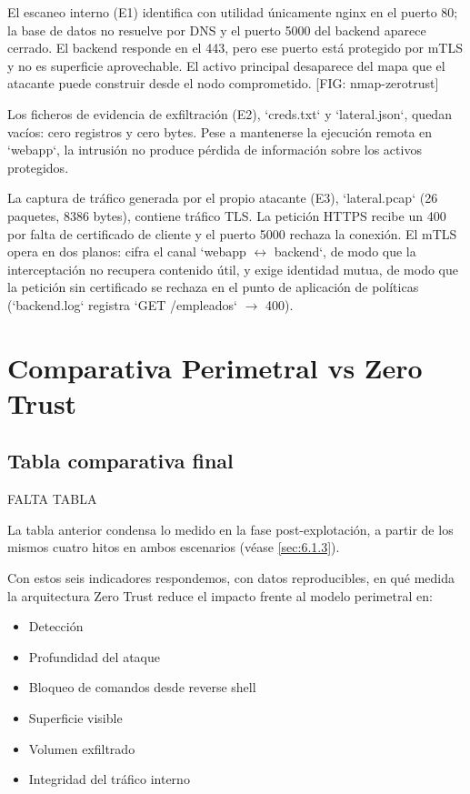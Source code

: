 \documentclass[11pt,spanish,listoffigures,listoftables]{tfgetsinf}
\begin{document}
        El escaneo interno (E1) identifica con utilidad únicamente nginx en el puerto 80; la base de datos no resuelve por DNS y el puerto 5000 del backend aparece cerrado. El backend responde en el 443, pero ese puerto está protegido por mTLS y no es superficie aprovechable. El activo principal desaparece del mapa que el atacante puede construir desde el nodo comprometido. [FIG: nmap-zerotrust]
        
        Los ficheros de evidencia de exfiltración (E2), `creds.txt` y `lateral.json`, quedan vacíos: cero registros y cero bytes. Pese a mantenerse la ejecución remota en `webapp`, la intrusión no produce pérdida de información sobre los activos protegidos.
        
        La captura de tráfico generada por el propio atacante (E3), `lateral.pcap` (26 paquetes, 8386 bytes), contiene tráfico TLS. La petición HTTPS recibe un 400 por falta de certificado de cliente y el puerto 5000 rechaza la conexión. El mTLS opera en dos planos: cifra el canal `webapp $\leftrightarrow$ backend`, de modo que la interceptación no recupera contenido útil, y exige identidad mutua, de modo que la petición sin certificado se rechaza en el punto de aplicación de políticas (`backend.log` registra `GET /empleados` $\rightarrow$ 400).

    \section{Comparativa Perimetral vs Zero Trust}
    \label{sec:6.4}
        \subsection{Tabla comparativa final}
        FALTA TABLA

        La tabla anterior condensa lo medido en la fase post-explotación, a partir de los mismos cuatro hitos en ambos escenarios (véase \cref{sec:6.1.3}). 

        Con estos seis indicadores respondemos, con datos reproducibles, en qué medida la arquitectura Zero Trust reduce el impacto frente al modelo perimetral en:
        \begin{itemize}
            \item Detección
            \item Profundidad del ataque
            \item Bloqueo de comandos desde reverse shell
            \item Superficie visible
            \item Volumen exfiltrado
            \item Integridad del tráfico interno
        \end{itemize}
        
\end{document}
